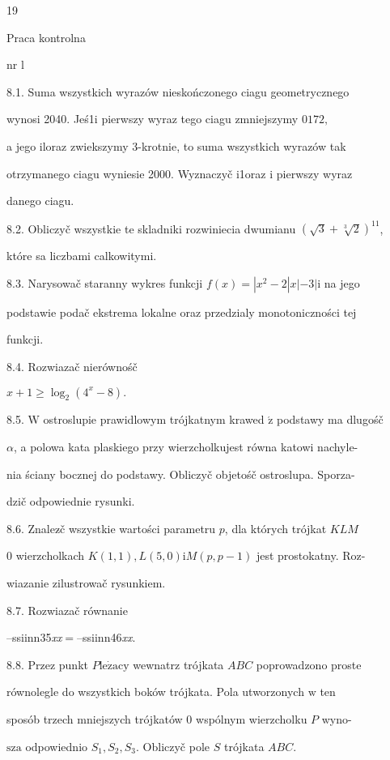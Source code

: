 \documentclass[a4paper,12pt]{article}
\begin{document}
19

Praca kontrolna

nr l

8.1. Suma wszystkich wyrazów nieskończonego ciagu geometrycznego

wynosi 2040. Jeś1i pierwszy wyraz tego ciagu zmniejszymy $0 172,$

a jego iloraz zwiekszymy 3-krotnie, to suma wszystkich wyrazów tak

otrzymanego ciagu wyniesie 2000. Wyznaczyč i1oraz $\mathrm{i}$ pierwszy wyraz

danego ciagu.

8.2. Obliczyč wszystkie te skladniki rozwiniecia dwumianu $(\sqrt{3}+\sqrt[3]{2})^{11}$,

które sa liczbami calkowitymi.

8.3. Narysowač staranny wykres funkcji $f(x) = |x^{2}-2|x|-3| \mathrm{i}$ na jego

podstawie podač ekstrema lokalne oraz przedzialy monotoniczności tej

funkcji.

8.4. Rozwiazač nierównośč

$x+1\geq\log_{2}(4^{x}-8).$

8.5. $\mathrm{W}$ ostroslupie prawidlowym trójkatnym krawed $\acute{\mathrm{z}}$ podstawy ma dlugośč

$\alpha$, a polowa kata plaskiego przy wierzcholkujest równa katowi nachyle-

nia ściany bocznej do podstawy. Obliczyč objetośč ostroslupa. Sporza-

dzič odpowiednie rysunki.

8.6. Znalez$\acute{}$č wszystkie wartości parametru $p$, dla których trójkat $KLM$

$0$ wierzcholkach $K(1,1), L(5,0)\mathrm{i}M(p,p-1)$ jest prostokatny. Roz-

wiazanie zilustrowač rysunkiem.

8.7. Rozwiazač równanie

--ssiinn35{\it xx}$=$--ssiinn46{\it xx}.

8.8. Przez punkt $P\mathrm{l}\mathrm{e}\dot{\mathrm{z}}\mathrm{a}\mathrm{c}\mathrm{y}$ wewnatrz trójkata $ABC$ poprowadzono proste

równolegle do wszystkich boków trójkata. Pola utworzonych $\mathrm{w}$ ten

sposób trzech mniejszych trójkatów $0$ wspólnym wierzcholku $P$ wyno-

$\mathrm{s}\mathrm{z}\mathrm{a}$ odpowiednio $S_{1}, S_{2}, S_{3}$. Obliczyč pole $S$ trójkata $ABC.$
\end{document}
